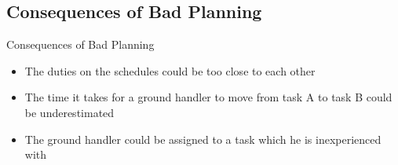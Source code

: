 \subsection{Consequences of Bad Planning}
\begin{frame}{Consequences of Bad Planning}{}
    \begin{itemize}
        \item The duties on the schedules could be too close to each other
        \item The time it takes for a ground handler to move from task A to task B could be underestimated
        \item The ground handler could be assigned to a task which he is inexperienced with
    \end{itemize}
\end{frame}
